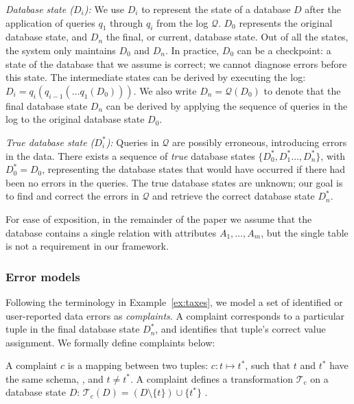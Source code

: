 \smallskip
\noindent
\emph{Database state ($D_i$):}
We use $D_i$ to represent the state of a database $D$ after the application of
queries $q_1$ through $q_i$ from the log $\mathcal{Q}$. $D_0$ represents the
original database state, and $D_n$ the final, or current, database state. Out
of all the states, the system only maintains $D_0$ and $D_n$. In practice,
$D_0$ can be a checkpoint: a state of the database that we assume is correct;
we cannot diagnose errors before this state. The intermediate states can be
derived by executing the log: $D_i=q_i(q_{i-1}(\dots q_1(D_0)))$. We also
write $D_n=\mathcal{Q}(D_0)$ to denote that the final database state $D_n$ can
be derived by applying the sequence of queries in the log to the original
database state $D_0$.

\smallskip
\noindent
\emph{True database state ($D_i^*$):}
Queries in $\mathcal{Q}$ are possibly erroneous, introducing errors in the
data. There exists a sequence of \emph{true} database states $\{D_0^*,
D_1^*\dots, D_n^*\}$, with $D_0^*=D_0$, representing the database states that
would have occurred if there had been no errors in the queries.
The true database states are unknown; our goal is to find and correct the errors in $\mathcal{Q}$ and retrieve the correct database state $D_n^*$.

For ease of exposition, in the remainder of the paper we assume that the
database contains a single relation with attributes $A_1,\ldots,A_m$,
but the single table is not a requirement in our framework.


\subsubsection*{Error models}

Following the terminology in Example~\ref{ex:taxes}, we model a set of identified or user-reported
data errors as \emph{complaints}. A complaint corresponds to a
particular tuple in the final database state $D_n^*$, and identifies
that tuple's correct value assignment. We formally define complaints
below:
\begin{definition}[Complaint]
    A complaint $c$ is a mapping between two tuples: $c: t\mapsto t^*$, such that $t$ and $t^*$ have the same schema, , and $t\neq t^*$. A complaint defines a
    transformation $\mathcal{T}_c$ on a database state $D$: $\mathcal{T}_c(D)
    = (D\setminus\{t\})\cup\{t^*\}$ .
\end{definition}

